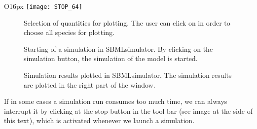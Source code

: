 \begin{wrapfigure}{O}{16px}
\vspace{\wrapfigspace}
\texttt{[image: STOP\_64]}
\end{wrapfigure}
\begin{figure}[t]
\centering
{}
\caption[Selection of quantities for plotting]{Selection of quantities for plotting.
The user can click on  in order to choose all species for plotting.}
\label{fig:selectSpecies}
\end{figure}
\begin{figure}[t]
\centering
{}
\caption[Starting of a simulation in SBMLsimulator]{Starting of a simulation in SBMLsimulator.
By clicking on the simulation button, the simulation of the model is started.}
\label{fig:startSimulation}
\end{figure}
\begin{figure}[t]
\centering
{}
\caption[Simulation results plotted in SBMLsimulator]{Simulation results plotted in SBMLsimulator.
The simulation results are plotted in the right part of the window.}
\label{fig:simulationResults}
\end{figure}
If in some cases a simulation run consumes too much time, we can always interrupt it by clicking at the stop button in the tool-bar (see image at the side of this text), which is activated whenever we launch a simulation.
